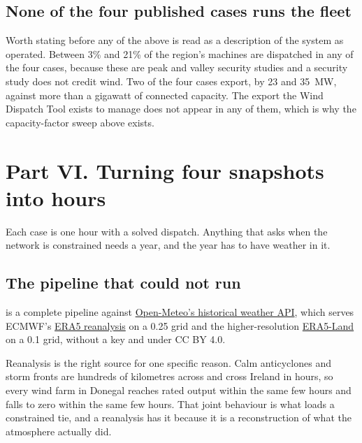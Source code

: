 \documentclass[11pt,a4paper]{article}
\begin{document}

\subsection{None of the four published cases runs the fleet}

Worth stating before any of the above is read as a description of the system as
operated. Between 3\% and 21\% of the region's machines are dispatched in any
of the four cases, because these are peak and valley security studies and a
security study does not credit wind. Two of the four cases export, by 23 and
35~MW, against more than a gigawatt of connected capacity. The export the Wind
Dispatch Tool exists to manage does not appear in any of them, which is why the
capacity-factor sweep above exists.

\clearpage
\section{Part VI. Turning four snapshots into hours}
\label{sec:hours}

Each case is one hour with a solved dispatch. Anything that asks when the
network is constrained needs a year, and the year has to have weather in it.

\subsection{The pipeline that could not run}

 is a complete pipeline against \href{https://open-meteo.com/en/docs/historical-weather-api}{Open-Meteo's historical weather API},
which serves ECMWF's \href{https://doi.org/10.1002/qj.3803}{ERA5 reanalysis} on a 0.25\textdegree{} grid and the
higher-resolution \href{https://doi.org/10.5194/essd-13-4349-2021}{ERA5-Land} on a 0.1\textdegree{} grid, without a key
and under CC BY 4.0.

Reanalysis is the right source for one specific reason. Calm anticyclones and
storm fronts are hundreds of kilometres across and cross Ireland in hours, so
every wind farm in Donegal reaches rated output within the same few hours and
falls to zero within the same few hours. That joint behaviour is what loads a
constrained tie, and a reanalysis has it because it is a reconstruction of what
the atmosphere actually did.
\end{document}
